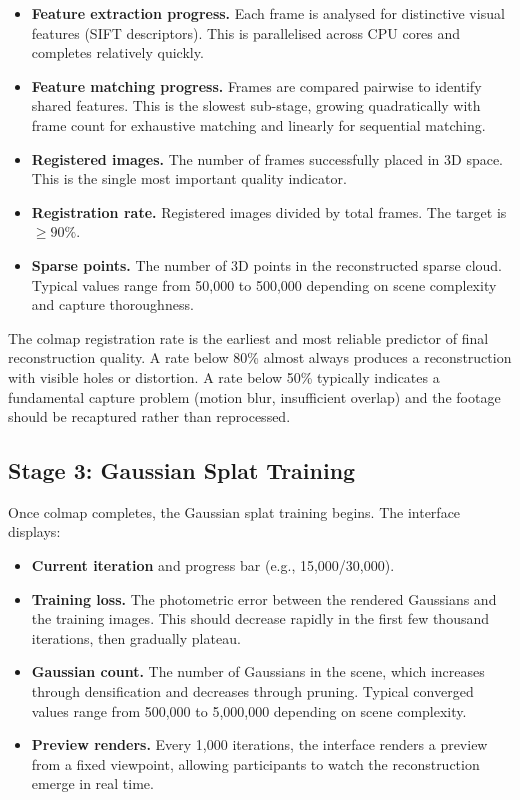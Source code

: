 \begin{itemize}
  \item \textbf{Feature extraction progress.} Each frame is analysed for distinctive visual features (SIFT descriptors). This is parallelised across CPU cores and completes relatively quickly.
  \item \textbf{Feature matching progress.} Frames are compared pairwise to identify shared features. This is the slowest sub-stage, growing quadratically with frame count for exhaustive matching and linearly for sequential matching.
  \item \textbf{Registered images.} The number of frames successfully placed in 3D space. This is the single most important quality indicator.
  \item \textbf{Registration rate.} Registered images divided by total frames. The target is $\geq 90\%$.
  \item \textbf{Sparse points.} The number of 3D points in the reconstructed sparse cloud. Typical values range from 50,000 to 500,000 depending on scene complexity and capture thoroughness.
\end{itemize}

\begin{keyfinding}
The \acrshort{colmap} registration rate is the earliest and most reliable predictor of final reconstruction quality. A rate below 80\% almost always produces a reconstruction with visible holes or distortion. A rate below 50\% typically indicates a fundamental capture problem (motion blur, insufficient overlap) and the footage should be recaptured rather than reprocessed.
\end{keyfinding}

\subsection{Stage 3: Gaussian Splat Training}

Once \acrshort{colmap} completes, the Gaussian splat training begins. The interface displays:

\begin{itemize}
  \item \textbf{Current iteration} and progress bar (e.g., 15,000/30,000).
  \item \textbf{Training loss.} The photometric error between the rendered Gaussians and the training images. This should decrease rapidly in the first few thousand iterations, then gradually plateau.
  \item \textbf{Gaussian count.} The number of Gaussians in the scene, which increases through densification and decreases through pruning. Typical converged values range from 500,000 to 5,000,000 depending on scene complexity.
  \item \textbf{Preview renders.} Every 1,000 iterations, the interface renders a preview from a fixed viewpoint, allowing participants to watch the reconstruction emerge in real time.
\end{itemize}


